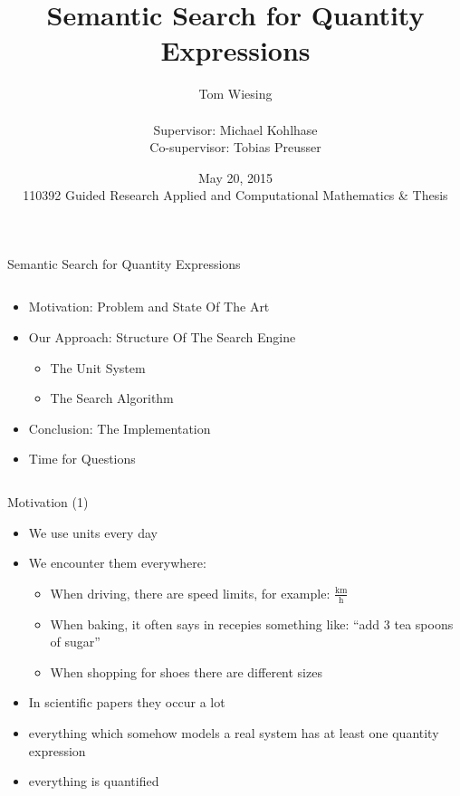 \documentclass{beamer}
\title{Semantic Search for Quantity Expressions}
\author{Tom Wiesing\\\ \\Supervisor: Michael Kohlhase\\Co-supervisor: Tobias Preusser}
\date{May 20, 2015 \\110392 Guided Research Applied and Computational Mathematics \& Thesis}
\begin{document}
  \frame{\titlepage}

  \begin{frame}{Semantic Search for Quantity Expressions}
    \pause
    \begin{columns}[T]
      \begin{column}[T]{7cm}


        \begin{itemize}[<+->]
          \item Motivation: Problem and State Of The Art

          \item Our Approach: Structure Of The Search Engine

          \begin{itemize}
            \item The Unit System
            \item The Search Algorithm
          \end{itemize}

          \item Conclusion: The Implementation

          \item Time for Questions
        \end{itemize}
      \end{column}
    \end{columns}
  \end{frame}

  \begin{frame}{Motivation (1)}
    \begin{itemize}[<+->]
      \item We use units every day

      \item We encounter them everywhere:
      \begin{itemize}[<+->]
        \item When driving, there are speed limits, for example:  $\frac{\text{km}}{\text{h}}$
        \item When baking, it often says in recepies something like: ``add 3 tea spoons of sugar''
        \item When shopping for shoes there are different sizes
      \end{itemize}
      \item In scientific papers they occur a lot
      \item everything which somehow models a real system has at least one quantity expression
      \item everything is quantified
    \end{itemize}
  \end{frame}
\end{document}
